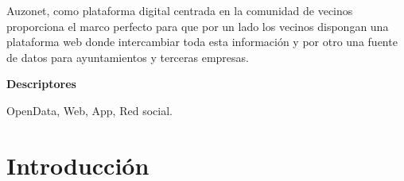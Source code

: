 \documentclass{DeustoFDP}
\begin{document}
Auzonet, como plataforma digital centrada en la comunidad de vecinos proporciona
el marco perfecto para que por un lado los vecinos dispongan una plataforma web
donde intercambiar toda esta información y por otro una fuente de datos para
ayuntamientos y terceras empresas.

\vspace{2em}

{\Large\bfseries\sectionfont Descriptores}
\vspace{3\medskipamount}

OpenData, Web, App, Red social.

\cleardoublepage\tableofcontents
\cleardoublepage\listoffigures
\cleardoublepage\listoftables
\cleardoublepage\listoflistings

\mainmatter
\pagestyle{phdthesis}

\chapter{Introducci\'on}\label{cha:introduccion}
\end{document}
